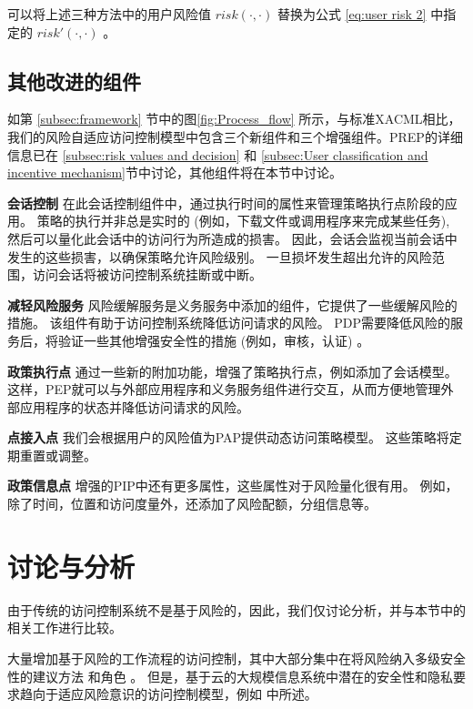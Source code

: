 可以将上述三种方法中的用户风险值 $risk(\cdot,\cdot)$ 替换为公式 \ref{eq:user risk 2} 中指定的 $risk'(\cdot,\cdot)$ 。

\subsection{其他改进的组件}
\label{subsec:Other improved components}
如第 \ref{subsec:framework} 节中的图\ref{fig:Process_flow} 所示，与标准XACML相比，我们的风险自适应访问控制模型中包含三个新组件和三个增强组件。PREP的详细信息已在 \ref{subsec:risk values and decision} 和 \ref{subsec:User classification and incentive mechanism}节中讨论，其他组件将在本节中讨论。

\textbf{会话控制} 在此会话控制组件中，通过执行时间的属性来管理策略执行点阶段的应用。 策略的执行并非总是实时的 (例如，下载文件或调用程序来完成某些任务), 然后可以量化此会话中的访问行为所造成的损害。 因此，会话会监视当前会话中发生的这些损害，以确保策略允许风险级别。 一旦损坏发生超出允许的风险范围，访问会话将被访问控制系统挂断或中断。

\textbf{减轻风险服务} 风险缓解服务是义务服务中添加的组件，它提供了一些缓解风险的措施。 该组件有助于访问控制系统降低访问请求的风险。 PDP需要降低风险的服务后，将验证一些其他增强安全性的措施 (例如，审核，认证) 。

\textbf{政策执行点} 通过一些新的附加功能，增强了策略执行点，例如添加了会话模型。 这样，PEP就可以与外部应用程序和义务服务组件进行交互，从而方便地管理外部应用程序的状态并降低访问请求的风险。

\textbf{点接入点} 我们会根据用户的风险值为PAP提供动态访问策略模型。 这些策略将定期重置或调整。

\textbf{政策信息点} 增强的PIP中还有更多属性，这些属性对于风险量化很有用。 例如，除了时间，位置和访问度量外，还添加了风险配额，分组信息等。

\section{讨论与分析}
\label{sec:Discussion and analysis}
由于传统的访问控制系统不是基于风险的，因此，我们仅讨论分析，并与本节中的相关工作进行比较。

大量增加基于风险的工作流程的访问控制，其中大部分集中在将风险纳入多级安全性的建议方法 \cite{cheng2007fuzzy,ni2010risk} 和角色 \cite{chen2011risk,choi2015framework}。 但是，基于云的大规模信息系统中潜在的安全性和隐私要求趋向于适应风险意识的访问控制模型，例如 \cite{wang2011quantified,shaikh2012dynamic,khambhammettu2013framework} 中所述。

